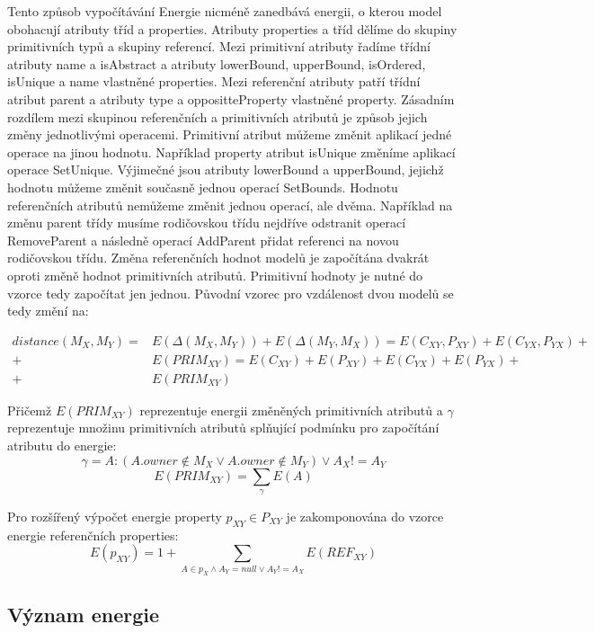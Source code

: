 \documentclass[11pt,twoside,a4paper]{book}
\begin{document}
Tento způsob vypočítávání Energie nicméně zanedbává energii, o kterou model
obohacují atributy tříd a properties. Atributy properties a tříd dělíme do
skupiny primitivních typů a skupiny referencí. Mezi primitivní atributy řadíme
třídní atributy name a isAbstract a atributy lowerBound, upperBound,
isOrdered, isUnique a name vlastněné properties. Mezi referenční atributy patří
třídní atribut parent a atributy type a oppositteProperty vlastněné property. Zásadním
rozdílem mezi skupinou referenčních a primitivních atributů je způsob jejich
změny jednotlivými operacemi. Primitivní atribut můžeme změnit aplikací jedné
operace na jinou hodnotu. Například property atribut isUnique změníme
aplikací operace SetUnique. Výjimečné jsou atributy lowerBound a upperBound,
jejichž hodnotu můžeme změnit současně jednou operací SetBounds.
Hodnotu referenčních atributů nemůžeme změnit jednou operací, ale
dvěma. Například na změnu parent třídy musíme rodičovskou třídu nejdříve
odstranit operací RemoveParent a následně operací AddParent přidat
referenci na novou rodičovskou třídu. Změna referenčních hodnot modelů je
započítána dvakrát oproti změně hodnot primitivních atributů. Primitivní
hodnoty je nutné do vzorce tedy započítat jen jednou. Původní vzorec pro
vzdálenost dvou modelů se tedy změní na:

\begin{align} distance(M_X,M_Y) = & E(\Delta(M_X,M_Y)) + E(\Delta(M_Y, M_X)) =
E(C_{XY}, P_{XY}) + E(C_{YX}, P_{YX}) + \nonumber \\ + & E(PRIM_{XY}) = 
E(C_{XY}) + E(P_{XY}) + E(C_{YX}) + E(P_{YX}) + \nonumber \\ + & E(PRIM_{XY})
\nonumber
\end{align}

Přičemž $E(PRIM_{XY})$ reprezentuje energii změněných primitivních atributů a
$\gamma$ reprezentuje množinu primitivních atributů splňující podmínku pro
započítání atributu do energie:
$$\gamma=A: (A.owner \notin M_{X} \vee A.owner \notin M_{Y})
\vee A_{X} != A_{Y} $$
$$E(PRIM_{XY}) = \sum_{\gamma}E(A)$$

Pro rozšířený výpočet energie property $p_{XY} \in P_{XY}$ je zakomponována do
vzorce energie referenčních properties:
$$E(p_{XY}) = 1 + \sum_{A \in p_X \wedge A_Y = null \vee A_Y !=
A_X}E(REF_{XY})$$


\subsection{Význam energie}
\end{document}
